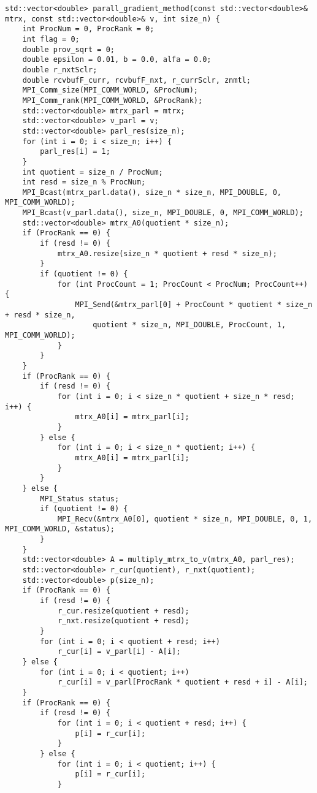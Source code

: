 \documentclass{report}
\begin{document}
\begin{lstlisting}
std::vector<double> parall_gradient_method(const std::vector<double>& mtrx, const std::vector<double>& v, int size_n) {
    int ProcNum = 0, ProcRank = 0;
    int flag = 0;
    double prov_sqrt = 0;
    double epsilon = 0.01, b = 0.0, alfa = 0.0;
    double r_nxtSclr;
    double rcvbufF_curr, rcvbufF_nxt, r_currSclr, znmtl;
    MPI_Comm_size(MPI_COMM_WORLD, &ProcNum);
    MPI_Comm_rank(MPI_COMM_WORLD, &ProcRank);
    std::vector<double> mtrx_parl = mtrx;
    std::vector<double> v_parl = v;
    std::vector<double> parl_res(size_n);
    for (int i = 0; i < size_n; i++) {
        parl_res[i] = 1;
    }
    int quotient = size_n / ProcNum;
    int resd = size_n % ProcNum;
    MPI_Bcast(mtrx_parl.data(), size_n * size_n, MPI_DOUBLE, 0, MPI_COMM_WORLD);
    MPI_Bcast(v_parl.data(), size_n, MPI_DOUBLE, 0, MPI_COMM_WORLD);
    std::vector<double> mtrx_A0(quotient * size_n);
    if (ProcRank == 0) {
        if (resd != 0) {
            mtrx_A0.resize(size_n * quotient + resd * size_n);
        }
        if (quotient != 0) {
            for (int ProcCount = 1; ProcCount < ProcNum; ProcCount++) {
                MPI_Send(&mtrx_parl[0] + ProcCount * quotient * size_n + resd * size_n,
                    quotient * size_n, MPI_DOUBLE, ProcCount, 1, MPI_COMM_WORLD);
            }
        }
    }
    if (ProcRank == 0) {
        if (resd != 0) {
            for (int i = 0; i < size_n * quotient + size_n * resd; i++) {
                mtrx_A0[i] = mtrx_parl[i];
            }
        } else {
            for (int i = 0; i < size_n * quotient; i++) {
                mtrx_A0[i] = mtrx_parl[i];
            }
        }
    } else {
        MPI_Status status;
        if (quotient != 0) {
            MPI_Recv(&mtrx_A0[0], quotient * size_n, MPI_DOUBLE, 0, 1, MPI_COMM_WORLD, &status);
        }
    }
    std::vector<double> A = multiply_mtrx_to_v(mtrx_A0, parl_res);
    std::vector<double> r_cur(quotient), r_nxt(quotient);
    std::vector<double> p(size_n);
    if (ProcRank == 0) {
        if (resd != 0) {
            r_cur.resize(quotient + resd);
            r_nxt.resize(quotient + resd);
        }
        for (int i = 0; i < quotient + resd; i++)
            r_cur[i] = v_parl[i] - A[i];
    } else {
        for (int i = 0; i < quotient; i++)
            r_cur[i] = v_parl[ProcRank * quotient + resd + i] - A[i];
    }
    if (ProcRank == 0) {
        if (resd != 0) {
            for (int i = 0; i < quotient + resd; i++) {
                p[i] = r_cur[i];
            }
        } else {
            for (int i = 0; i < quotient; i++) {
                p[i] = r_cur[i];
            }

\end{lstlisting}
\end{document}
